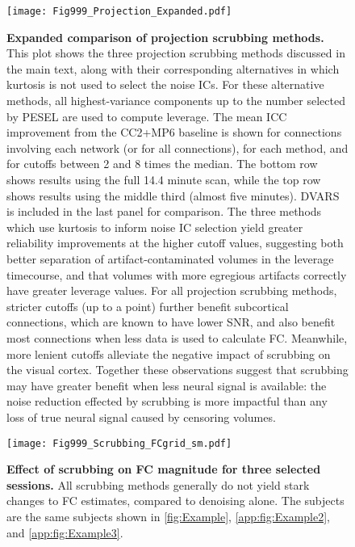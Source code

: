 \documentclass{article}
\begin{document}
\begin{figure}
    \centering
    \texttt{[image: Fig999\_Projection\_Expanded.pdf]}
    \caption{\small \textbf{Expanded comparison of projection scrubbing methods.} This plot shows the three projection scrubbing methods discussed in the main text, along with their corresponding alternatives in which kurtosis is not used to select the noise ICs. For these alternative methods, all highest-variance components up to the number selected by PESEL are used to compute leverage. The mean ICC improvement from the CC2+MP6 baseline is shown for connections involving each network (or for all connections), for each method, and for cutoffs between 2 and 8 times the median. The bottom row shows results using the full 14.4 minute scan, while the top row shows results using the middle third (almost five minutes). DVARS is included in the last panel for comparison. The three methods which use kurtosis to inform noise IC selection yield greater reliability improvements at the higher cutoff values, suggesting both better separation of artifact-contaminated volumes in the leverage timecourse, and that volumes with more egregious artifacts correctly have greater leverage values. For all projection scrubbing methods, stricter cutoffs (up to a point) further benefit subcortical connections, which are known to have lower SNR, and also benefit most connections when less data is used to calculate FC. Meanwhile, more lenient cutoffs alleviate the negative impact of scrubbing on the visual cortex. Together these observations suggest that scrubbing may have greater benefit when less neural signal is available: the noise reduction effected by scrubbing is more impactful than any loss of true neural signal caused by censoring volumes.}
    \label{app:fig:ProjectionExpanded}
\end{figure}

\begin{figure}
    \centering
    \texttt{[image: Fig999\_Scrubbing\_FCgrid\_sm.pdf]}
    \caption{\small \textbf{Effect of scrubbing on FC magnitude for three selected sessions.} All scrubbing methods generally do not yield stark changes to FC estimates, compared to denoising alone. The subjects are the same subjects shown in \autoref{fig:Example}, \autoref{app:fig:Example2}, and \autoref{app:fig:Example3}.}
    \label{app:fig:scrubFCgrid}
\end{figure}
\end{document}
